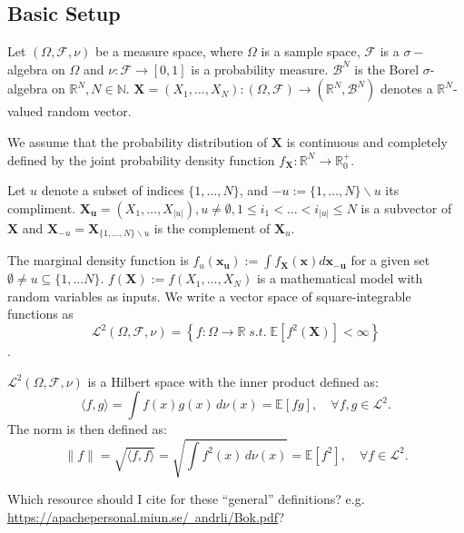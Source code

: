 \subsection{Basic Setup}
Let $(\Omega, \mathcal{F}, \nu)$ be a measure space, where $\Omega$ is a sample space, $\mathcal{F}$ is a $\sigma-$algebra on $\Omega$ and $\nu: \mathcal{F} \rightarrow [0, 1]$ is a probability measure. $\mathcal{B}^N$ is the Borel $\sigma$-algebra on $\mathbb{R}^N, N \in \mathbb{N}$.
$\boldsymbol{X} = (X_1, \dots, X_N): (\Omega, \mathcal{F}) \rightarrow (\mathbb{R}^N, \mathcal{B}^N)$ denotes a $\mathbb{R}^N$-valued random vector.\par
We assume that the probability distribution of $\boldsymbol{X}$ is continuous and completely defined by the joint probability density function $f_{\boldsymbol{X}}: \mathbb{R}^N \rightarrow \mathbb{R}_{0}^+$.\par

Let $u$ denote a subset of indices $\{1, \dots, N\}$, and $-u := \{1, \dots, N\} \backslash{} u$ its compliment.
$\boldsymbol{X_u} = (X_1, \dots, X_{|u|}), u \neq \emptyset, 1 \leq i_1 < \dots < i_{|u|} \leq N$ is a subvector of $\boldsymbol{X}$ and $\boldsymbol{X}_{-u} = \boldsymbol{X}_{\{1, \dots, N\} \backslash{} u}$ is the complement of $\boldsymbol{X}_u$.\par

The marginal density function is $f_u(\boldsymbol{x_u}) := \int f_{\boldsymbol{X}}(\boldsymbol{x})d\boldsymbol{x_{-u}}$ for a given set $\emptyset \neq u \subseteq \{1, \dots N\}$.
$f(\boldsymbol{X}) := f(X_1, \dots, X_N)$ is a mathematical model with random variables as inputs.
We write a vector space of square-integrable functions as
\[\mathcal{L}^2(\Omega, \mathcal{F}, \nu) = \left\{ f: \Omega \rightarrow \mathbb{R} \; \textit{s.t.} \; \mathbb{E}[f^2(\boldsymbol{X})] < \infty \right\}\].

$\mathcal{L}^2(\Omega, \mathcal{F}, \nu)$ is a Hilbert space with the inner product defined as:
\[
\langle f, g \rangle = \int f(x) g(x) \, d\nu(x) = \mathbb{E}[fg], \quad\forall f, g \in \mathcal{L}^2.
\]
The norm is then defined as:
\[
\|f\| = \sqrt{\langle f, f \rangle} = \sqrt{\int f^2(x) \, d\nu(x)} = \mathbb{E}[f^2], \quad \forall f \in \mathcal{L}^2.
\]

{\color{blue} Which resource should I cite for these ``general'' definitions? e.g. \href{https://apachepersonal.miun.se/~andrli/Bok.pdf}{https://apachepersonal.miun.se/~andrli/Bok.pdf}?}



